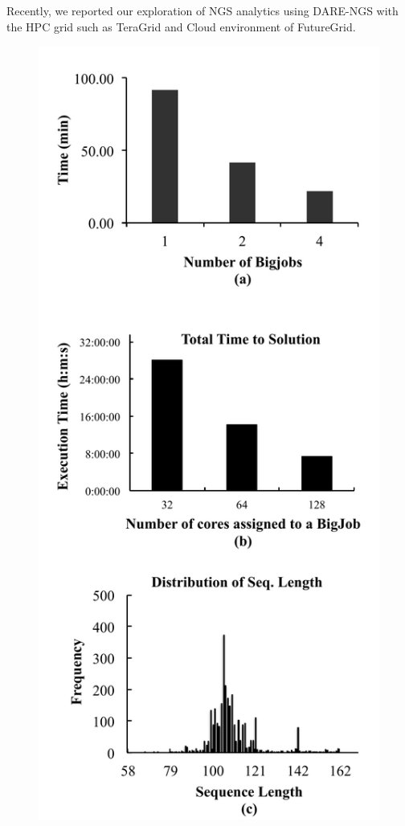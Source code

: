 \documentclass{sig-alternate}
\begin{document}
Recently, we reported our exploration of NGS analytics using DARE-NGS with the HPC grid such as TeraGrid and
Cloud environment of FutureGrid\cite{ecmls11}.   



\begin{figure}
 \centering
\includegraphics[scale=0.40]{figures/dare-rfold-result.pdf}

\end{figure}
\end{document}

